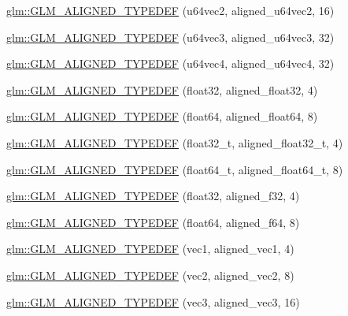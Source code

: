 \begin{DoxyCompactItemize}
\item 
\hyperlink{group__gtx__type__aligned_ga929427a7627940cdf3304f9c050b677d}{glm\-::\-G\-L\-M\-\_\-\-A\-L\-I\-G\-N\-E\-D\-\_\-\-T\-Y\-P\-E\-D\-E\-F} (u64vec2, aligned\-\_\-u64vec2, 16)
\item 
\hyperlink{group__gtx__type__aligned_gae373b6c04fdf9879f33d63e6949c037e}{glm\-::\-G\-L\-M\-\_\-\-A\-L\-I\-G\-N\-E\-D\-\_\-\-T\-Y\-P\-E\-D\-E\-F} (u64vec3, aligned\-\_\-u64vec3, 32)
\item 
\hyperlink{group__gtx__type__aligned_ga53a8a03dca2015baec4584f45b8e9cdc}{glm\-::\-G\-L\-M\-\_\-\-A\-L\-I\-G\-N\-E\-D\-\_\-\-T\-Y\-P\-E\-D\-E\-F} (u64vec4, aligned\-\_\-u64vec4, 32)
\item 
\hyperlink{group__gtx__type__aligned_gab3301bae94ef5bf59fbdd9a24e7d2a01}{glm\-::\-G\-L\-M\-\_\-\-A\-L\-I\-G\-N\-E\-D\-\_\-\-T\-Y\-P\-E\-D\-E\-F} (float32, aligned\-\_\-float32, 4)
\item 
\hyperlink{group__gtx__type__aligned_ga75930684ff2233171c573e603f216162}{glm\-::\-G\-L\-M\-\_\-\-A\-L\-I\-G\-N\-E\-D\-\_\-\-T\-Y\-P\-E\-D\-E\-F} (float64, aligned\-\_\-float64, 8)
\item 
\hyperlink{group__gtx__type__aligned_gada9b0bea273d3ae0286f891533b9568f}{glm\-::\-G\-L\-M\-\_\-\-A\-L\-I\-G\-N\-E\-D\-\_\-\-T\-Y\-P\-E\-D\-E\-F} (float32\-\_\-t, aligned\-\_\-float32\-\_\-t, 4)
\item 
\hyperlink{group__gtx__type__aligned_ga6e3a2d83b131336219a0f4c7cbba2a48}{glm\-::\-G\-L\-M\-\_\-\-A\-L\-I\-G\-N\-E\-D\-\_\-\-T\-Y\-P\-E\-D\-E\-F} (float64\-\_\-t, aligned\-\_\-float64\-\_\-t, 8)
\item 
\hyperlink{group__gtx__type__aligned_gadbce23b9f23d77bb3884e289a574ebd5}{glm\-::\-G\-L\-M\-\_\-\-A\-L\-I\-G\-N\-E\-D\-\_\-\-T\-Y\-P\-E\-D\-E\-F} (float32, aligned\-\_\-f32, 4)
\item 
\hyperlink{group__gtx__type__aligned_gaa4deaa0dea930c393d55e7a4352b0a20}{glm\-::\-G\-L\-M\-\_\-\-A\-L\-I\-G\-N\-E\-D\-\_\-\-T\-Y\-P\-E\-D\-E\-F} (float64, aligned\-\_\-f64, 8)
\item 
\hyperlink{group__gtx__type__aligned_ga81bc497b2bfc6f80bab690c6ee28f0f9}{glm\-::\-G\-L\-M\-\_\-\-A\-L\-I\-G\-N\-E\-D\-\_\-\-T\-Y\-P\-E\-D\-E\-F} (vec1, aligned\-\_\-vec1, 4)
\item 
\hyperlink{group__gtx__type__aligned_gada3e8f783e9d4b90006695a16c39d4d4}{glm\-::\-G\-L\-M\-\_\-\-A\-L\-I\-G\-N\-E\-D\-\_\-\-T\-Y\-P\-E\-D\-E\-F} (vec2, aligned\-\_\-vec2, 8)
\item 
\hyperlink{group__gtx__type__aligned_gab8d081fac3a38d6f55fa552f32168d32}{glm\-::\-G\-L\-M\-\_\-\-A\-L\-I\-G\-N\-E\-D\-\_\-\-T\-Y\-P\-E\-D\-E\-F} (vec3, aligned\-\_\-vec3, 16)

\end{DoxyCompactItemize}
